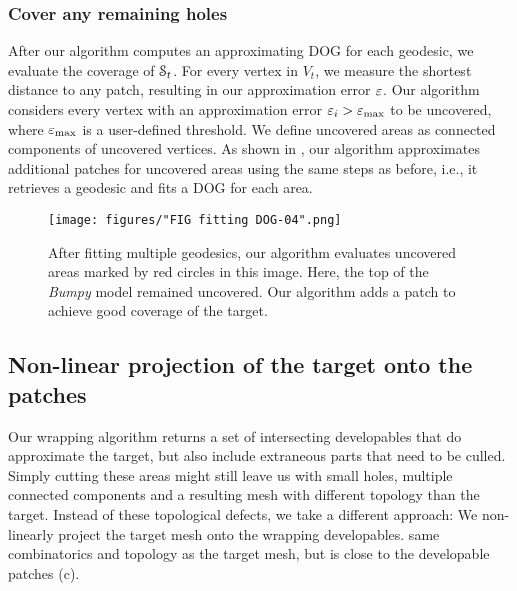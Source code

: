 \subsubsection{Cover any remaining holes}

After our algorithm computes an approximating DOG for each geodesic, we evaluate the coverage of $ \mathcal{S}_t $. For every vertex in $V_t$, we measure the shortest distance to any patch, resulting in our approximation error $\varepsilon$. 
Our algorithm considers every vertex with an approximation error $ \varepsilon_i > \varepsilon_{\text{max}} $ to be uncovered, where $ \varepsilon_{\text{max}} $ is a user-defined threshold. We define uncovered areas as connected components of uncovered vertices. As shown in , our algorithm approximates additional patches for uncovered areas using the same steps as before, i.e., it retrieves a geodesic and fits a DOG for each area. 

\begin{figure} [h!]
\centering
\noindent\texttt{[image: figures/"FIG fitting DOG-04".png]}
\caption{
	After fitting multiple geodesics, our algorithm evaluates uncovered areas marked by red circles in this image. Here, the top of the \emph{Bumpy} model  remained uncovered. Our algorithm adds a patch to achieve good coverage of the target. 
	\label{fig:multi_patch_holes}}
\end{figure}





\subsection{Non-linear projection of the target onto the patches}


Our wrapping algorithm returns a set of intersecting developables that do approximate the target, but also include extraneous parts that need to be culled. Simply cutting these areas might still leave us with small holes, multiple connected components and a resulting mesh with different topology than the target. Instead of  
these topological defects, we take a different approach: We non-linearly project the target mesh onto the wrapping developables. 
same combinatorics and topology as the target mesh, but is close to the developable patches (c). 

